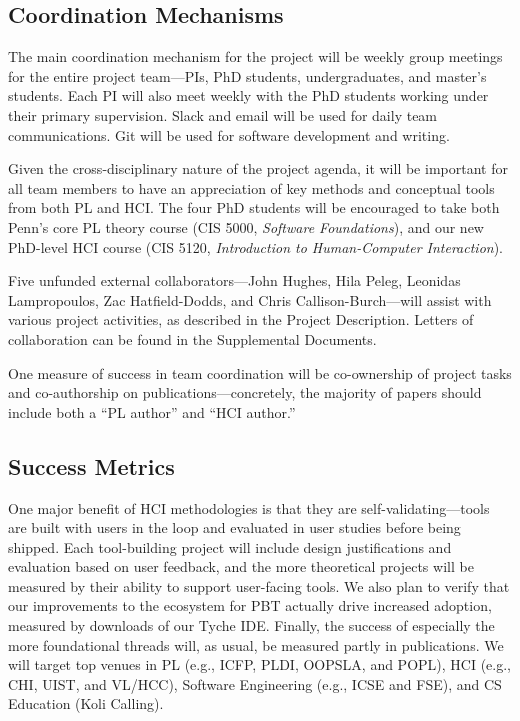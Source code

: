 \subsection*{Coordination Mechanisms}

The main coordination mechanism for the project will be weekly group
meetings for the entire project team---PIs, PhD students, undergraduates, and master's students.
%
Each PI will also meet weekly with the PhD students working under
their primary supervision.
%
Slack and email will be used for daily team communications.  Git will
be used for software development and writing.

Given the cross-disciplinary nature of the project agenda, it will be
important for all team members to have an appreciation of key methods
and conceptual tools from both PL and HCI.  The four PhD students will
be encouraged to take both Penn's core PL theory course (CIS 5000,
{\em Software Foundations}), and our new PhD-level HCI course (CIS
5120, {\em Introduction to Human-Computer Interaction}).

Five unfunded external collaborators---John Hughes, Hila Peleg,
Leonidas Lampropoulos, Zac Hatfield-Dodds, and Chris
Callison-Burch---will assist with various project activities, as
described in the Project Description.  Letters of collaboration can be
found in the Supplemental Documents.

One measure of success in team coordination will be co-ownership of
project tasks and co-authorship on publications---concretely, the
majority of papers should include both a ``PL author'' and
``HCI author.''

\subsection*{Success Metrics}

One major benefit of
HCI methodologies is that they are self-validating---tools are built with users
in the loop and evaluated in user studies before being shipped.
Each tool-building project will include design justifications and
evaluation based on user feedback, and the more theoretical
projects will be measured by their ability to support user-facing tools.
%
We also plan to verify that our improvements to the ecosystem for PBT
actually drive increased adoption, measured by
downloads of our Tyche IDE.
%
%
Finally, the
success of especially the more foundational threads will, as usual, be measured
partly in publications.  We will target top venues in PL (e.g., ICFP, PLDI,
OOPSLA, and POPL), HCI (e.g., CHI, UIST, and VL/HCC), Software Engineering
(e.g., ICSE and FSE), and CS Education (Koli Calling).

\clearpage
